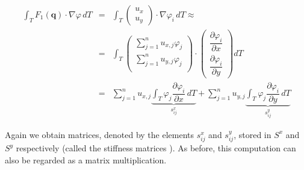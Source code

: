 \documentclass[a4paper, twoside]{article}
\newcommand{\pd}[2]{\dfrac{\partial #1}{\partial #2}}
\renewcommand{\phi}{\varphi}
\begin{document}
\begin{eqnarray*}
  \int_T F_1(\mathbf{q}) \cdot \nabla \phi \, dT & = &
  \int_T
  \begin{pmatrix}
    u_x \\ u_y
  \end{pmatrix}
  \cdot \nabla \phi_i \, dT \approx \\
  &=& \int_T
  \begin{pmatrix}
    \sum_{j=1}^n u_{x,j} \phi_j \\
    \sum_{j=1}^n u_{y,j} \phi_j \\
  \end{pmatrix}
  \cdot
  \begin{pmatrix}
    \pd{\phi_i}{x} \\
    \pd{\phi_i}{y}
  \end{pmatrix} dT \\
  & = & \sum_{j=1}^n u_{x,j} \underbrace{\int_T \phi_j \pd{\phi_i}{x} \, dT}_{s_{ij}^x} + \sum_{j=1}^n u_{y,j} \underbrace{\int_T \phi_j \pd{\phi_i}{y} \, dT}_{s_{ij}^y}
\end{eqnarray*}

Again we obtain matrices, denoted by the elements $s_{ij}^x$ and $s_{ij}^y$, stored in $S^x$ and $S^y$ respectively (called the stiffness matrices \cite{schwaiger08adaptive}). As before, this computation can also be regarded as a matrix multiplication.
\end{document}
